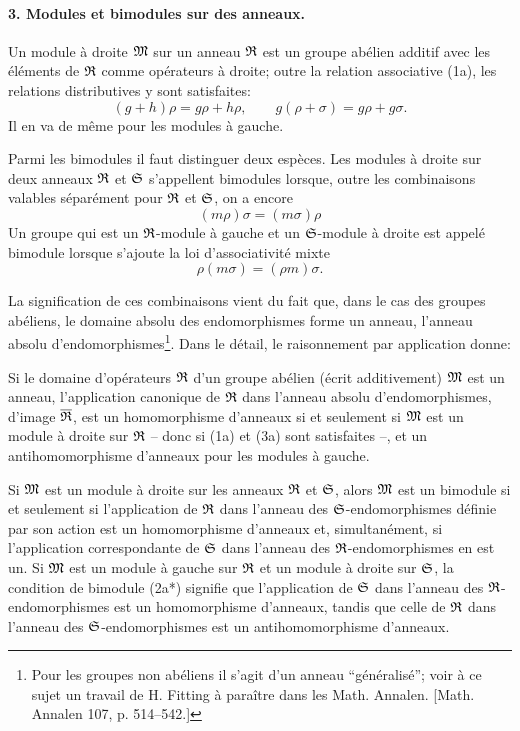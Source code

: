 \paragraph{3. Modules et bimodules sur des anneaux.}
Un module à droite \(\mathfrak M\) sur un anneau \(\mathfrak R\) est un groupe abélien additif avec les éléments de \(\mathfrak R\) comme opérateurs à droite; outre la relation associative (1a), les relations distributives y sont satisfaites:
\[
        (g+h)\rho=g\rho+h\rho,\qquad
        g(\rho+\sigma)=g\rho+g\sigma.                                  \tag{3a}
\]
Il en va de même pour les modules à gauche.

Parmi les bimodules il faut distinguer deux espèces. Les modules à droite sur deux anneaux \(\mathfrak R\) et \(\mathfrak S\) s'appellent bimodules lorsque, outre les combinaisons valables séparément pour \(\mathfrak R\) et \(\mathfrak S\), on a encore
\[
        (m\rho)\sigma=(m\sigma)\rho
\]
Un groupe qui est un \(\mathfrak R\)-module à gauche et un \(\mathfrak S\)-module à droite est appelé bimodule lorsque s'ajoute la loi d'associativité mixte
\[
        \rho(m\sigma)=(\rho m)\sigma .
\]

La signification de ces combinaisons vient du fait que, dans le cas des groupes abéliens, le domaine absolu des endomorphismes forme un anneau, l'anneau absolu d'endomorphismes\footnote{Pour les groupes non abéliens il s'agit d'un anneau ``généralisé''; voir à ce sujet un travail de H. Fitting à paraître dans les Math. Annalen. [Math. Annalen 107, p. 514--542.]}. Dans le détail, le raisonnement par application donne:

Si le domaine d'opérateurs \(\mathfrak R\) d'un groupe abélien (écrit additivement) \(\mathfrak M\) est un anneau, l'application canonique de \(\mathfrak R\) dans l'anneau absolu d'endomorphismes, d'image \(\overline{\mathfrak R}\), est un homomorphisme d'anneaux si et seulement si \(\mathfrak M\) est un module à droite sur \(\mathfrak R\) -- donc si (1a) et (3a) sont satisfaites --, et un antihomomorphisme d'anneaux pour les modules à gauche.

Si \(\mathfrak M\) est un module à droite sur les anneaux \(\mathfrak R\) et \(\mathfrak S\), alors \(\mathfrak M\) est un bimodule si et seulement si l'application de \(\mathfrak R\) dans l'anneau des \(\mathfrak S\)-endomorphismes définie par son action est un homomorphisme d'anneaux et, simultanément, si l'application correspondante de \(\mathfrak S\) dans l'anneau des \(\mathfrak R\)-endomorphismes en est un. Si \(\mathfrak M\) est un module à gauche sur \(\mathfrak R\) et un module à droite sur \(\mathfrak S\), la condition de bimodule (2a*) signifie que l'application de \(\mathfrak S\) dans l'anneau des \(\mathfrak R\)-endomorphismes est un homomorphisme d'anneaux, tandis que celle de \(\mathfrak R\) dans l'anneau des \(\mathfrak S\)-endomorphismes est un antihomomorphisme d'anneaux.

